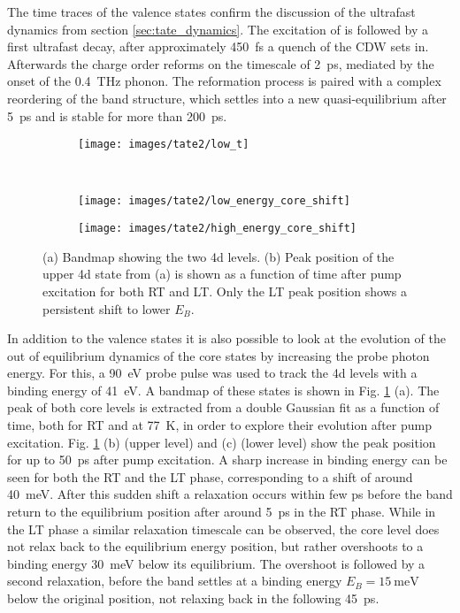 The time traces of the valence states confirm the discussion of the ultrafast dynamics from section \ref{sec:tate_dynamics}.
The excitation of  is followed by a first ultrafast decay, after approximately \qty{450}{\femto\second} a quench of the CDW sets in.
Afterwards the charge order reforms on the timescale of \qty{2}{\pico\second}, mediated by the onset of the \qty{0.4}{\tera\hertz} phonon.
The reformation process is paired with a complex reordering of the band structure, which settles into a new quasi-equilibrium after \qty{5}{\pico\second} and is stable for more than \qty{200}{\pico\second}.

\begin{figure}[t!]
	\centering
	\begin{subfigure}[b]{0.33\textwidth}
		\texttt{[image: images/tate2/low\_t]}
		\caption{}
	\end{subfigure}
	\\
	\begin{subfigure}[b]{0.49\textwidth}
		\texttt{[image: images/tate2/low\_energy\_core\_shift]}
		\caption{}
	\end{subfigure}
	\hfill
	\begin{subfigure}[b]{0.49\textwidth}
		\texttt{[image: images/tate2/high\_energy\_core\_shift]}
		\caption{}
	\end{subfigure}
	\caption{(a) Bandmap showing the two  4d levels. (b) Peak position of the upper 4d state from (a) is shown as a function of time after pump excitation for both RT and LT. Only the LT peak position shows a persistent shift to lower $E_B$.}
	\label{fig:tate_core}
\end{figure}

In addition to the valence states it is also possible to look at the evolution of the out of equilibrium dynamics of the core states by increasing the probe photon energy.
For this, a \qty{90}{\electronvolt} probe pulse was used to track the  4d levels with a binding energy of \qty{41}{\electronvolt}.
A bandmap of these states is shown in Fig. \ref{fig:tate_core} (a).
The peak of both core levels is extracted from a double Gaussian fit as a function of time, both for RT and at \qty{77}{\kelvin}, in order to explore their evolution after pump excitation.
Fig. \ref{fig:tate_core} (b) (upper level) and (c) (lower level) show the peak position for up to \qty{50}{\pico\second} after pump excitation.
A sharp increase in binding energy can be seen for both the RT and the LT phase, corresponding to a shift of around \qty{40}{\milli\electronvolt}.
After this sudden shift a relaxation occurs within few \unit{\pico\second} before the band return to the equilibrium position after around \qty{5}{\pico\second} in the RT phase.
While in the LT phase a similar relaxation timescale can be observed, the core level does not relax back to the equilibrium energy position, but rather overshoots to a binding energy \qty{30}{\milli\electronvolt} below its equilibrium.
The overshoot is followed by a second relaxation, before the band settles at a binding energy $E_B=\qty{15}{\milli\electronvolt}$ below the original position, not relaxing back in the following \qty{45}{\pico\second}.


